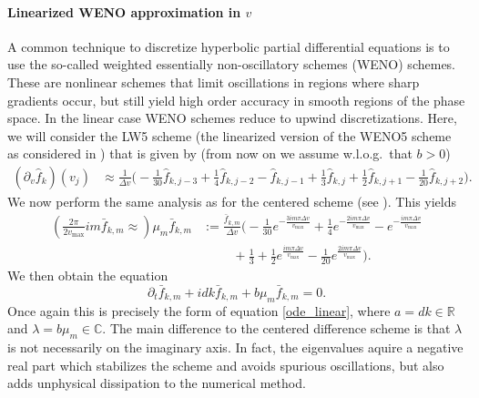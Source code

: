 \paragraph{Linearized WENO approximation in $v$\\}
A common technique to discretize hyperbolic partial differential equations is to use the so-called weighted essentially non-oscillatory schemes (WENO) schemes. These are nonlinear schemes that limit oscillations in regions where sharp gradients occur, but still yield high order accuracy in smooth regions of the phase space. In the linear case WENO schemes reduce to upwind discretizations. Here, we will consider the LW5 scheme (the linearized version of the WENO5 scheme as considered in \cite{Baldauf:2008, Lunet:2017, Motamed:2010, Wang:2007}) that is given by (from now on we assume w.l.o.g.~that $b>0$)
\begin{align*}
  (\partial_v \hat{f}_k)(v_j) &\approx \frac{1}{\Delta v}\Big(-\frac{1}{30} \hat{f}_{k,j-3} +\frac{1}{4} \hat{f}_{k,j-2} -\hat{f}_{k,j-1} + \frac{1}{3} \hat{f}_{k,j} +\frac{1}{2} \hat{f}_{k,j+1} - \frac{1}{20} \hat{f}_{k,j+2}\Big). 
\end{align*}
We now perform the same analysis as for the centered scheme (see \cite{Baldauf:2008, Crouseilles:2012}). This yields
\begin{align}
  \left( \frac{2\pi }{2 v_{\max}}  i m \bar{f}_{k, m} \approx \right)
  \mu_m \bar{f}_{k, m} &:= \frac{\bar{f}_{k,m}}{\Delta v}\Big(-\frac{1}{30} e^{-\frac{3i m\pi \Delta v}{v_{\max}}} +\frac{1}{4} e^{-\frac{2i m \pi \Delta v}{v_{\max}}} -e^{-\frac{i m \pi \Delta v}{v_{\max}}}  \nonumber\\
  &\hspace{1cm}+ \frac{1}{3}  +\frac{1}{2} e^{\frac{i m \pi \Delta v}{v_{\max}}} - \frac{1}{20} e^{\frac{2i m \pi \Delta v}{v_{\max}}}\Big). 
  \label{lw5symbol}
\end{align}
We then obtain the equation 
\begin{equation}
	\label{discrete_linear_transport_weno}
	\partial_t \bar{f}_{k,m} + i dk\bar{f}_{k,m} +b \mu_m \bar{f}_{k,m}= 0.
\end{equation}
Once again this is precisely the form of equation \eqref{ode_linear}, where $a=dk\in\mathbb{R}$ and $\lambda=b\mu_m \in\mathbb{C}$. The main difference to the centered difference scheme is that $\lambda$ is not necessarily on the imaginary axis. In fact, the eigenvalues aquire a negative real part which stabilizes the scheme and avoids spurious oscillations, but also adds unphysical dissipation to the numerical method.

